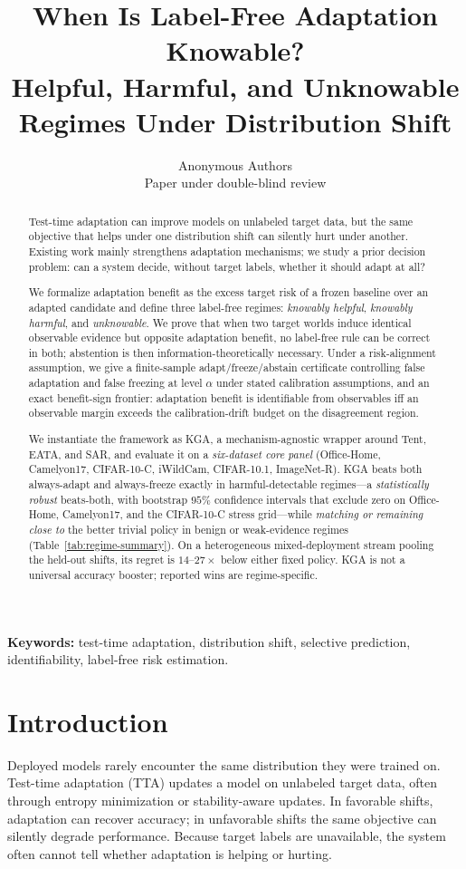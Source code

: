 \documentclass[11pt]{article}
\title{When Is Label-Free Adaptation Knowable? \\
Helpful, Harmful, and Unknowable Regimes Under Distribution Shift}
\author{Anonymous Authors\\
\small Paper under double-blind review}
\theoremstyle{plain}
\theoremstyle{definition}
\theoremstyle{remark}
\begin{document}
\maketitle

\begin{abstract}
Test-time adaptation can improve models on unlabeled target data, but the same
objective that helps under one distribution shift can silently hurt under another.
Existing work mainly strengthens adaptation mechanisms; we study a prior decision
problem: can a system decide, without target labels, whether it should adapt at all?

We formalize adaptation benefit as the excess target risk of a frozen baseline over
an adapted candidate and define three label-free regimes: \emph{knowably helpful},
\emph{knowably harmful}, and \emph{unknowable}. We prove that when two target worlds
induce identical observable evidence but opposite adaptation benefit, no label-free
rule can be correct in both; abstention is then information-theoretically necessary.
Under a risk-alignment assumption, we give a finite-sample adapt/freeze/abstain
certificate controlling false adaptation and false freezing at level $\alpha$ under
stated calibration assumptions, and an exact benefit-sign frontier: adaptation benefit
is identifiable from observables iff an observable margin exceeds the calibration-drift
budget on the disagreement region.

We instantiate the framework as \textsc{KGA}, a mechanism-agnostic wrapper around
Tent, EATA, and SAR, and evaluate it on a \emph{six-dataset core panel} (Office-Home,
Camelyon17, CIFAR-10-C, iWildCam, CIFAR-10.1, ImageNet-R). \textsc{KGA} beats both
always-adapt and always-freeze exactly in harmful-detectable regimes---a
\emph{statistically robust} beats-both, with bootstrap $95\%$ confidence intervals that
exclude zero on Office-Home, Camelyon17, and the CIFAR-10-C stress grid---while
\emph{matching or remaining close to} the better trivial policy in benign or weak-evidence
regimes (Table~\ref{tab:regime-summary}). On a heterogeneous mixed-deployment stream pooling
the held-out shifts, its regret is $14$--$27\times$ below either fixed policy. \textsc{KGA}
is not a universal accuracy booster; reported wins are regime-specific.
\end{abstract}

\noindent\textbf{Keywords:} test-time adaptation, distribution shift, selective prediction, identifiability, label-free risk estimation.

\section{Introduction}\label{sec:intro}
Deployed models rarely encounter the same distribution they were trained on.
Test-time adaptation (TTA) updates a model on unlabeled target data, often through
entropy minimization or stability-aware updates. In favorable shifts, adaptation can
recover accuracy; in unfavorable shifts the same objective can silently degrade
performance. Because target labels are unavailable, the system often cannot tell
whether adaptation is helping or hurting.
\end{document}
